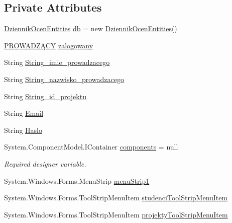 \subsection*{Private Attributes}
\begin{DoxyCompactItemize}
\item 
\hyperlink{class_dziennik_ocen_1_1_dziennik_ocen_entities}{Dziennik\+Ocen\+Entities} \hyperlink{class_dziennik_ocen_1_1_form_prowadzacy_a8debab90e31034998329165c00836aca}{db} = new \hyperlink{class_dziennik_ocen_1_1_dziennik_ocen_entities}{Dziennik\+Ocen\+Entities}()
\item 
\hyperlink{class_dziennik_ocen_1_1_p_r_o_w_a_d_z_xC4_x84_c_y}{P\+R\+O\+W\+A\+D\+ZĄ\+CY} \hyperlink{class_dziennik_ocen_1_1_form_prowadzacy_a36367f60833c5ef9928db605143c1f9b}{zalogowany}
\item 
String \hyperlink{class_dziennik_ocen_1_1_form_prowadzacy_a152e43d7b72d76a06fdea70f0aaf92e5}{String\+\_\+imie\+\_\+prowadzacego}
\item 
String \hyperlink{class_dziennik_ocen_1_1_form_prowadzacy_afd2e14b9219c1568b3b06ec1131b1256}{String\+\_\+nazwisko\+\_\+prowadzacego}
\item 
String \hyperlink{class_dziennik_ocen_1_1_form_prowadzacy_afe096a0f8d35718d3971c19359d3674c}{String\+\_\+id\+\_\+projektu}
\item 
String \hyperlink{class_dziennik_ocen_1_1_form_prowadzacy_a2a8c88aed0e523c43b18ac50002680d4}{Email}
\item 
String \hyperlink{class_dziennik_ocen_1_1_form_prowadzacy_a97552a9d67d35422ddc14b94222d100b}{Haslo}
\item 
System.\+Component\+Model.\+I\+Container \hyperlink{class_dziennik_ocen_1_1_form_prowadzacy_a74ef1b6ab2d81abfa6a0f441ff9e8ec6}{components} = null
\begin{DoxyCompactList}\small\item\em Required designer variable. \end{DoxyCompactList}\item 
System.\+Windows.\+Forms.\+Menu\+Strip \hyperlink{class_dziennik_ocen_1_1_form_prowadzacy_ae5ef793320aa64d107281ca1e3254c50}{menu\+Strip1}
\item 
System.\+Windows.\+Forms.\+Tool\+Strip\+Menu\+Item \hyperlink{class_dziennik_ocen_1_1_form_prowadzacy_a220128b78996df92745a4945919daf9b}{studenci\+Tool\+Strip\+Menu\+Item}
\item 
System.\+Windows.\+Forms.\+Tool\+Strip\+Menu\+Item \hyperlink{class_dziennik_ocen_1_1_form_prowadzacy_a7c069bd9f8684667df3a89500f0cf02d}{projekty\+Tool\+Strip\+Menu\+Item}

\end{DoxyCompactItemize}
